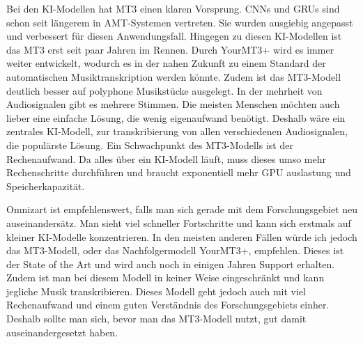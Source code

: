 Bei den KI-Modellen hat MT3 einen klaren Vorsprung.
CNNs und GRUs sind schon seit längerem in AMT-Systemen vertreten.
Sie wurden ausgiebig angepasst und verbessert für diesen Anwendungsfall.
Hingegen zu diesen KI-Modellen ist das MT3 erst seit paar Jahren im Rennen.
Durch YourMT3+ wird es immer weiter entwickelt,
wodurch es in der nahen Zukunft zu einem Standard der automatischen Musiktranskription werden könnte.
Zudem ist das MT3-Modell deutlich besser auf polyphone Musikstücke ausgelegt.
In der mehrheit von Audiosignalen gibt es mehrere Stimmen.
Die meisten Menschen möchten auch lieber eine einfache Lösung, die wenig eigenaufwand benötigt.
Deshalb wäre ein zentrales KI-Modell, zur transkribierung von allen verschiedenen Audiosignalen, die populärste Lösung.
Ein Schwachpunkt des MT3-Modells ist der Rechenaufwand.
Da alles über ein KI-Modell läuft,
muss dieses umso mehr Rechenschritte durchführen und braucht exponentiell mehr GPU auslastung und Speicherkapazität.

Omnizart ist empfehlenswert, falls man sich gerade mit dem Forschungsgebiet neu auseinandersätz.
Man sieht viel schneller Fortschritte und kann sich erstmals auf kleiner KI-Modelle konzentrieren.
In den meisten anderen Fällen würde ich jedoch das MT3-Modell, oder das Nachfolgermodell YourMT3+, empfehlen.
Dieses ist der State of the Art und wird auch noch in einigen Jahren Support erhalten.
Zudem ist man bei diesem Modell in keiner Weise eingeschränkt und kann jegliche Musik transkribieren.
Dieses Modell geht jedoch auch mit viel Rechenaufwand und einem guten Verständnis des Forschungsgebiets einher.
Deshalb sollte man sich, bevor man das MT3-Modell nutzt, gut damit auseinandergesetzt haben.